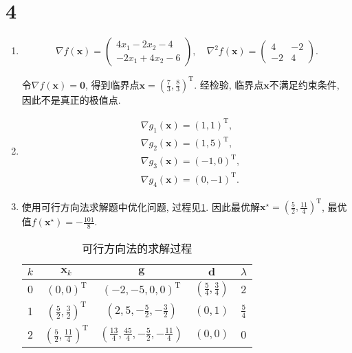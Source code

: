 \section*{4}

\begin{enumerate}[label = \alph*)]
    \item
        \begin{equation*}
            \nabla f(\bm{x})=
            \begin{pmatrix}
                4x_1-2x_2-4 \\
                -2x_1+4x_2-6
            \end{pmatrix},\quad
            \nabla^2 f(\bm{x})=
            \begin{pmatrix}
                4 & -2 \\
                -2 & 4
            \end{pmatrix}.
        \end{equation*}

        令$\nabla f(\bm{x})=\bm{0}$, 得到临界点$\bm{x}=\left(\frac{7}{3}, \frac{8}{3}\right)^\mathrm{T}$.
        经检验, 临界点$\bm{x}$不满足约束条件, 因此不是真正的极值点.

    \item
        \begin{align*}
            &\nabla g_1(\bm{x})=(1,1)^\mathrm{T}, \\
            &\nabla g_2(\bm{x})=(1,5)^\mathrm{T}, \\
            &\nabla g_3(\bm{x})=(-1,0)^\mathrm{T}, \\
            &\nabla g_4(\bm{x})=(0,-1)^\mathrm{T}.
        \end{align*}

    \item
        使用可行方向法求解题中优化问题, 过程见\cref{table:4}.
        因此最优解$\bm{x}^\star=\left(\frac{5}{2},\frac{11}{4}\right)^\mathrm{T}$, 最优值$f(\bm{x}^\star)=-\frac{101}{8}$.
        \begin{table}[ht]
            \centering
            \caption{可行方向法的求解过程}
            \label{table:4}
            \begin{tabular}{ccccc}
                \toprule
                $k$ & $\bm{x}_k$ & $\bm{g}$ & $\bm{d}$ & $\lambda$ \\
                \midrule
                0 & $(0,0)^\mathrm{T}$ & $(-2,-5,0,0)^\mathrm{T}$ & $\left(\frac{5}{4},\frac{3}{4}\right)$ & 2 \\
                1 & $\left(\frac{5}{2},\frac{3}{2}\right)^\mathrm{T}$ & $\left(2,5,-\frac{5}{2},-\frac{3}{2}\right)$ & $(0,1)$ & $\frac{5}{4}$ \\
                2 & $\left(\frac{5}{2},\frac{11}{4}\right)^\mathrm{T}$ & $\left(\frac{13}{4},\frac{45}{4},-\frac{5}{2},-\frac{11}{4}\right)$ & $(0,0)$ & 0 \\
                \bottomrule
            \end{tabular}
        \end{table}
\end{enumerate}
